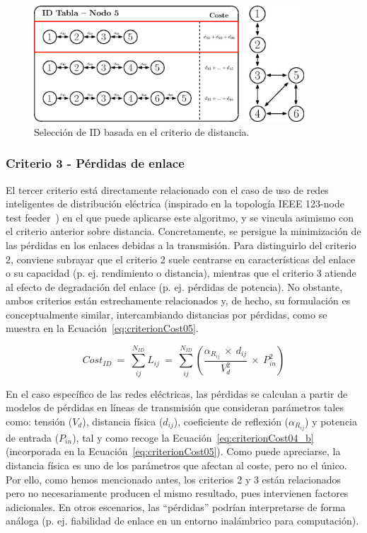 \begin{figure}[ht!]
    \centering
    \includegraphics[width=0.9\textwidth]{fig/05_den2ne/den2ne_06.eps}
    \caption{Selección de ID basada en el criterio de distancia.}
    \label{fig:den2ne_06}
\end{figure}

\subsubsection{Criterio 3 - Pérdidas de enlace}

El tercer criterio está directamente relacionado con el caso de uso de redes inteligentes de distribución eléctrica (inspirado en la topología IEEE 123-node test feeder~\cite{Schneider17}) en el que puede aplicarse este algoritmo, y se vincula asimismo con el criterio anterior sobre distancia. Concretamente, se persigue la minimización de las pérdidas en los enlaces debidas a la transmisión. Para distinguirlo del criterio 2, conviene subrayar que el criterio 2 suele centrarse en características del enlace o su capacidad (p. ej. rendimiento o distancia), mientras que el criterio 3 atiende al efecto de degradación del enlace (p. ej. pérdidas de potencia). No obstante, ambos criterios están estrechamente relacionados y, de hecho, su formulación es conceptualmente similar, intercambiando distancias por pérdidas, como se muestra en la Ecuación~\ref{eq:criterionCost05}.

\begin{equation}\label{eq:criterionCost05}
      Cost_{ID}  \: = \: \sum_{ij}^{N_{ID}} L_{ij} \: = \: \sum_{ij}^{N_{ID}} (\frac{\alpha_{R_{ij}} \: \times \: d_{ij}}{V_{d}^{2}}\: \times \: P_{in}^{2})
\end{equation}
\vspace{0.2cm}

En el caso específico de las redes eléctricas, las pérdidas se calculan a partir de modelos de pérdidas en líneas de transmisión que consideran parámetros tales como: tensión ($V_{d}$), distancia física ($d_{ij}$), coeficiente de reflexión ($\alpha_{R_{ij}}$) y potencia de entrada ($P_{in}$), tal y como recoge la Ecuación~\ref{eq:criterionCost04_b} (incorporada en la Ecuación~\ref{eq:criterionCost05}). Como puede apreciarse, la distancia física es uno de los parámetros que afectan al coste, pero no el único. Por ello, como hemos mencionado antes, los criterios 2 y 3 están relacionados pero no necesariamente producen el mismo resultado, pues intervienen factores adicionales. En otros escenarios, las ``pérdidas'' podrían interpretarse de forma análoga (p. ej. fiabilidad de enlace en un entorno inalámbrico para computación).

